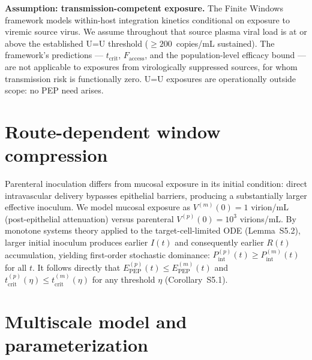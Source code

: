 \documentclass[10pt,letterpaper]{article}
\theoremstyle{definition}
\theoremstyle{remark}
\newcommand{\Pint}{P_{\text{int}}}
\newcommand{\Epep}{E_{\text{PEP}}}
\newcommand{\Faccess}{F_{\text{access}}}
\newcommand{\tcrit}{t_{\text{crit}}}
\begin{document}
\textbf{Assumption: transmission-competent exposure.} The Finite Windows framework models within-host integration kinetics conditional on exposure to viremic source virus. We assume throughout that source plasma viral load is at or above the established U=U threshold ($\geq 200$~copies/mL sustained). The framework's predictions --- $\tcrit$, $\Faccess$, and the population-level efficacy bound --- are not applicable to exposures from virologically suppressed sources, for whom transmission risk is functionally zero\cite{rodger2019,bavinton2018}. U=U exposures are operationally outside scope: no PEP need arises.


\section*{Route-dependent window compression}

Parenteral inoculation differs from mucosal exposure in its initial condition: direct intravascular delivery bypasses epithelial barriers, producing a substantially larger effective inoculum. We model mucosal exposure as $V^{(m)}(0) = 1$ virion/mL (post-epithelial attenuation) versus parenteral $V^{(p)}(0) = 10^{3}$ virions/mL. By monotone systems theory applied to the target-cell-limited ODE (Lemma~S5.2), larger initial inoculum produces earlier $I(t)$ and consequently earlier $R(t)$ accumulation, yielding first-order stochastic dominance: $\Pint^{(p)}(t) \geq \Pint^{(m)}(t)$ for all $t$. It follows directly that $\Epep^{(p)}(t) \leq \Epep^{(m)}(t)$ and $\tcrit^{(p)}(\eta) \leq \tcrit^{(m)}(\eta)$ for any threshold $\eta$ (Corollary~S5.1).


\section*{Multiscale model and parameterization}
\end{document}
